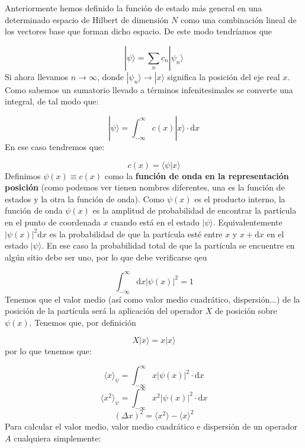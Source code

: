 \documentclass[12pt,a4paper]{book}
\numberwithin{equation}{chapter}
\numberwithin{figure}{chapter}
\newcommand{\D}{\mathrm{d}}
\newcommand{\intinf}{\int_{-\infty}^{\infty}}
\begin{document}
Anteriormente hemos definido la función de estado más general en una determinado espacio de Hilbert de dimensión $N$ como una combinación lineal de los vectores base que forman dicho espacio. De este modo tendríamos que

\begin{equation}
|\psi \rangle = \sum_n c_n |\psi_n\rangle
\end{equation}
Si ahora llevamos $n \rightarrow \infty$, donde $|\psi_n \rangle \rightarrow |x\rangle$ significa la posición del eje real $x$. Como sabemos un sumatorio llevado a términos infenitesimales se converte una integral, de tal modo que:

\begin{equation}
|\psi \rangle = \intinf c(x) |x\rangle  \cdot \D x 
\end{equation}
En ese caso tendremos que:

\begin{equation}
c (x) = \langle \psi | x \rangle
\end{equation}
Definimos $\psi (x) \equiv c (x)$ como la \textbf{función de onda en la representación posición} (como podemos ver tienen nombres diferentes, una es la función de estados y la otra la función de onda). Como $\psi(x)$ es el producto interno, la función de onda $\psi (x)$ es la amplitud de probabilidad de encontrar la partícula en el punto de coordenada $x$ cuando está en el estado $|\psi\rangle$. Equivalentemente $|\psi(x)|^2 \D x$ es la probabilidad de que la partícula esté entre $x$ y $x+\D x$ en el estado $|\psi\rangle$. En ese caso la probabilidad total de que la partícula se encuentre en algún sitio debe ser uno, por lo que debe verificarse qeu

\begin{equation}
\intinf \D x |\psi(x)|^2 = 1
\end{equation}
Tenemos que el valor medio (así como valor medio cuadrático, dispersión...) de la posición de la partícula será la aplicación del operador $X$ de posición sobre $\psi(x)$. Tenemos que, por definición

\begin{equation}
X  |x\rangle = x |x\rangle
\end{equation}
por lo que tenemos que:

\begin{equation}
\langle x \rangle_\psi = \intinf x|\psi (x)|^2 \cdot \D x  
\end{equation}
\begin{equation}
\langle x^2 \rangle_\psi = \intinf x^2 |\psi (x)|^2 \cdot \D x 
\end{equation}
\begin{equation}
(\Delta x)^2 = \langle x^2 \rangle - \langle x \rangle^2
\end{equation}
Para calcular el valor medio, valor medio cuadrático e dispersión de un operador $A$ cualquiera simplemente: 
\end{document}
